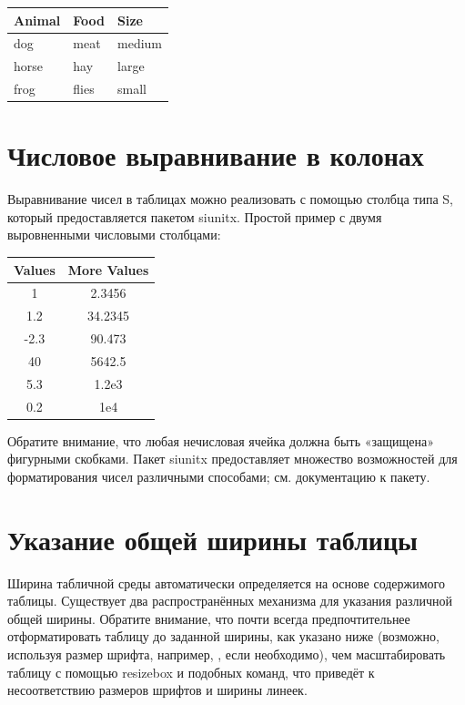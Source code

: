 \documentclass{article}
\begin{document}
  \smallskip

  \begin{tabular}{@{} lll@{}} \toprule[2pt]
    Animal & Food & Size \\ \midrule[1pt]
    dog & meat & medium \\
  \cmidrule[0.5pt](r{1pt}l{1cm}){1-2}
    horse & hay & large \\
    frog & flies & small \\ \bottomrule[2pt]
  \end{tabular}

  \smallskip


  
  \section{Числовое выравнивание в колонах}
  \label{sec:alignment}
  
  Выравнивание чисел в таблицах можно реализовать с помощью столбца типа S, который
  предоставляется пакетом siunitx.
  Простой пример с двумя выровненными числовыми столбцами:

  \smallskip

  \begin{tabular}{SS}
  \toprule
  {Values} & {More Values} \\
   & 2.3456 \\
    1.2 & 34.2345 \\
    -2.3 & 90.473 \\
    40 & 5642.5 \\
    5.3 & 1.2e3 \\
    0.2 & 1e4 \\
  \bottomrule
  \end{tabular}

  \smallskip

  Обратите внимание, что любая нечисловая ячейка должна быть «защищена» фигурными скобками.
  Пакет siunitx предоставляет множество возможностей для форматирования чисел
  различными способами; см. документацию к пакету.




  \section{Указание общей ширины таблицы}
  \label{sec:tablewidth}
  
  Ширина табличной среды автоматически определяется на основе
  содержимого таблицы. Существует два распространённых механизма для указания
  различной общей ширины.
  Обратите внимание, что почти всегда предпочтительнее отформатировать таблицу до заданной ширины, как указано ниже (возможно, используя размер шрифта, например, \small, если необходимо), чем масштабировать
  таблицу с помощью resizebox и подобных команд, что приведёт к несоответствию
  размеров шрифтов и ширины линеек.
\end{document}
